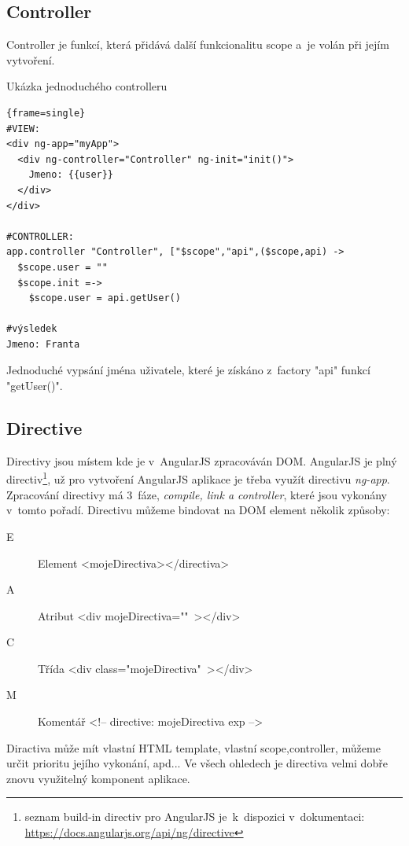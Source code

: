 \documentclass[a4paper,12pt,twoside,BCOR=10mm]{article}
\renewcommand{\it}[1]{\textit{#1}}    %
\newenvironment{codeframe}{%
  \begin{Sbox} 
    \begin{minipage} 
      {\columnwidth-\leftmargin-\rightmargin-2\fboxsep-2\fboxrule-4pt} 
}{%

  \end{minipage} 
  \end{Sbox} 
  \begin{center} 
    \fcolorbox{black}{codeback}{\TheSbox} 
  \end{center} 
}
\begin{document}
\subsection{Controller}
Controller je funkcí, která přidává další funkcionalitu scope a~je volán při jejím vytvoření.\cite{ngBOOK}

Ukázka jednoduchého controlleru
     \begin{codeframe} 
      \begin{Verbatim}{frame=single}
#VIEW:
<div ng-app="myApp">
  <div ng-controller="Controller" ng-init="init()">
    Jmeno: {{user}}
  </div>
</div>

#CONTROLLER:
app.controller "Controller", ["$scope","api",($scope,api) ->
  $scope.user = ""
  $scope.init =->
    $scope.user = api.getUser()

#výsledek
Jmeno: Franta
\end{Verbatim} 
    \end{codeframe}
Jednoduché vypsání jména uživatele, které je získáno z~factory "api" funkcí "getUser()".

\subsection{Directive}
Directivy jsou místem kde je v~AngularJS zpracováván DOM. AngularJS je plný directiv\footnote{seznam build-in directiv pro AngularJS je~k~dispozici v~dokumentaci: \href{https://docs.angularjs.org/api/ng/directive}{https://docs.angularjs.org/api/ng/directive}}, už pro vytvoření AngularJS aplikace je třeba využít directivu \it{ng-app}.\cite{ngBOOK}\\

Zpracování directivy má 3~fáze, \it{compile, link a controller}, které jsou vykonány v~tomto pořadí. Directivu můžeme bindovat na DOM element několik způsoby\cite{ngBOOK}:
\begin{description}
\item[E] Element <mojeDirectiva></directiva>
\item[A] Atribut <div mojeDirectiva=""~></div>
\item[C] Třída <div class="mojeDirectiva"~></div>
\item[M] Komentář <!-- directive: mojeDirectiva exp -->
 \end{description}

 Diractiva může mít vlastní HTML template, vlastní scope,controller, můžeme určit prioritu jejího vykonání, apd... Ve všech ohledech je directiva velmi dobře znovu využitelný komponent aplikace.\cite{ngBOOK}\\
\end{document}
